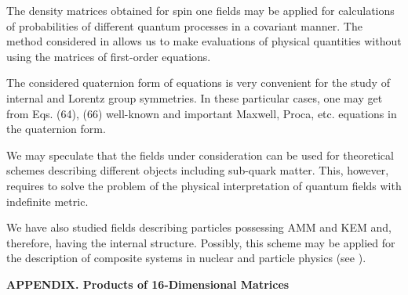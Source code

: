 \documentclass[a4paper,12pt]{article}
\begin{document}
The density matrices obtained for spin one fields may be applied
for calculations of probabilities of different quantum processes
in a covariant manner. The method considered in \cite{Fedorov}
allows us to make evaluations of physical quantities without using
the matrices of first-order equations.

The considered quaternion form of equations is very convenient for
the study of internal and Lorentz group symmetries. In these
particular cases, one may get from Eqs. (64), (66) well-known and
important Maxwell, Proca, etc. equations in the quaternion form.

We may speculate that the fields under consideration can be used
for theoretical schemes describing different objects including
sub-quark matter. This, however, requires to solve the problem of
the physical interpretation of quantum fields with indefinite
metric.

We have also studied fields describing particles possessing AMM
and KEM and, therefore, having the internal structure. Possibly,
this scheme may be applied for the description of composite
systems in nuclear and particle physics (see \cite{Kirchbach}).

\vspace{5mm} {\bf APPENDIX. Products of 16-Dimensional Matrices}
\vspace{5mm}
\end{document}
